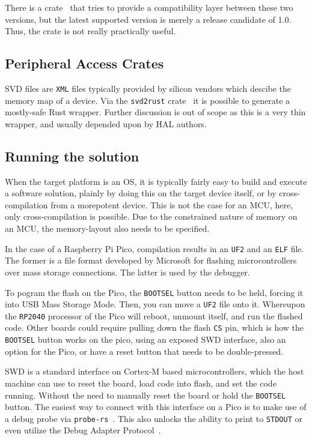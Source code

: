There is a crate~\cite{gh:ehcl} that tries to provide a compatibility layer between these two versions, but the latest supported version is merely a release candidate of 1.0. Thus, the crate is not really practically useful.

\subsection{Peripheral Access Crates}

\gls{SVD} files are \texttt{XML} files typically provided by silicon vendors which descibe the memory map of a device. Via the \texttt{svd2rust} crate~\cite{crates:svd2rust} it is possible to generate a mostly-safe Rust wrapper. Further discussion is out of scope as this is a very thin wrapper, and usually depended upon by \gls{HAL} authors.

\subsection{Running the solution}
\label{sec:running}

When the target platform is an \gls{OS}, it is typically fairly easy to build and execute a software solution, plainly by doing this on the target device itself, or by cross-compilation from a morepotent device. This is not the case for an \gls{MCU}, here, only cross-compilation is possible. Due to the constrained nature of memory on an \gls{MCU}, the memory-layout also needs to be specified.

In the case of a Raspberry Pi Pico, compilation results in an \texttt{UF2} and an \texttt{ELF} file. The former is a file format developed by Microsoft for flashing microcontrollers over mass storage connections. The latter is used by the debugger.

To pogram the flash on the Pico, the \texttt{BOOTSEL} button needs to be held, forcing it into USB Mass Storage Mode. Then, you can move a \texttt{UF2} file onto it. Whereupon the \texttt{RP2040} processor of the Pico will reboot, unmount itself, and run the flashed code. Other boards could require pulling down the flash \texttt{CS} pin, which is how the \texttt{BOOTSEL} button works on the pico, using an exposed \gls{SWD} interface, also an option for the Pico, or have a reset button that needs to be double-pressed.

\gls{SWD} is a standard interface on Cortex-M based microcontrollers, which the host machine can use to reset the board, load code into flash, and set the code running. Without the need to manually reset the board or hold the \texttt{BOOTSEL} button. The easiest way to connect with this interface on a Pico is to make use of a debug probe via \texttt{probe-rs}~\cite{probe-rs}. This also unlocks the ability to print to \texttt{STDOUT} or even utilize the Debug Adapter Protocol~\cite{dap}.

